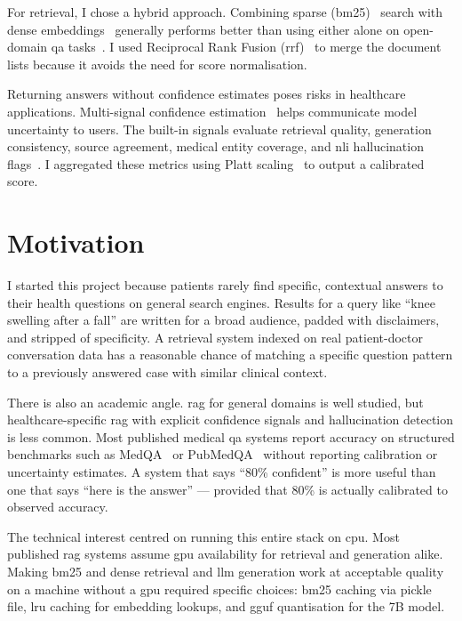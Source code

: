 For retrieval, I chose a hybrid approach. Combining sparse (\ac{bm25})~\cite{robertson2009bm25} search with dense embeddings~\cite{reimers2019sbert} generally performs better than using either alone on open-domain \ac{qa} tasks~\cite{ma2022hybrid}. I used Reciprocal Rank Fusion (\ac{rrf})~\cite{cormack2009rrf} to merge the document lists because it avoids the need for score normalisation.

Returning answers without confidence estimates poses risks in healthcare applications. Multi-signal confidence estimation~\cite{guo2017calibration} helps communicate model uncertainty to users. The built-in signals evaluate retrieval quality, generation consistency, source agreement, medical entity coverage, and \ac{nli} hallucination flags~\cite{he2021deberta}. I aggregated these metrics using Platt scaling~\cite{platt1999probabilistic} to output a calibrated score.

\section{Motivation}

I started this project because patients rarely find specific, contextual answers to their health questions on general search engines. Results for a query like ``knee swelling after a fall'' are written for a broad audience, padded with disclaimers, and stripped of specificity. A retrieval system indexed on real patient-doctor conversation data has a reasonable chance of matching a specific question pattern to a previously answered case with similar clinical context.

There is also an academic angle. \ac{rag} for general domains is well studied, but healthcare-specific \ac{rag} with explicit confidence signals and hallucination detection is less common. Most published medical \ac{qa} systems report accuracy on structured benchmarks such as MedQA~\cite{jin2021medqa} \allowbreak{}or PubMedQA~\cite{jin2019pubmedqa} without reporting calibration or uncertainty estimates. A system that says ``80\% confident'' is more useful than one that says ``here is the answer'' --- provided that 80\% is actually calibrated to observed accuracy.

The technical interest centred on running this entire stack on \ac{cpu}. Most published \ac{rag} systems assume \ac{gpu} availability for retrieval and generation alike. Making \ac{bm25} and dense retrieval and \ac{llm} generation work at acceptable quality on a machine without a \ac{gpu} required specific choices: \ac{bm25} caching via pickle file, \ac{lru} caching for embedding lookups, and \ac{gguf} quantisation for the 7B model.

